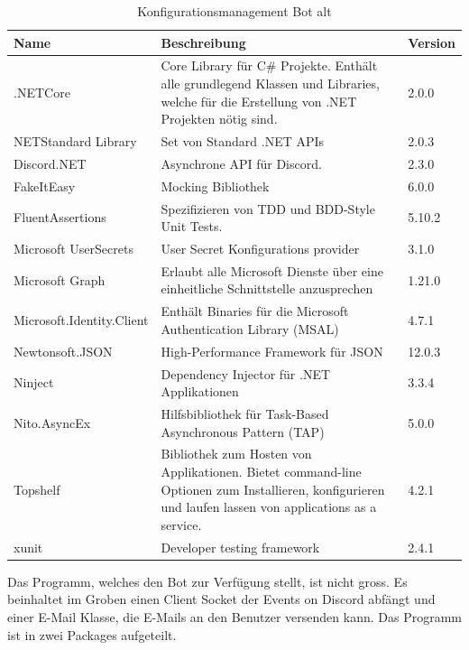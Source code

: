 \documentclass[a4paper, table]{article}
\begin{document}
\begin{table}[h]
    \centering
    \begin{tabular}{|l|p{20em}|l|}
        \hline
        \rowcolor[gray]{.9} Name & Beschreibung & Version \\
        \hline
        .NETCore & Core Library für C\# Projekte.
        Enthält alle grundlegend Klassen und Libraries, welche für die Erstellung von .NET Projekten nötig sind. & 2.0.0 \\
        \hline
        NETStandard Library & Set von Standard .NET \gls{API}s & 2.0.3 \\
        \hline
        Discord.NET & Asynchrone \gls{API} für Discord. & 2.3.0 \\
        \hline
        FakeItEasy & Mocking Bibliothek & 6.0.0 \\
        \hline
        FluentAssertions & Spezifizieren von TDD und BDD-Style Unit Tests. & 5.10.2 \\
        \hline
        Microsoft UserSecrets & User Secret Konfigurations provider & 3.1.0 \\
        \hline
        Microsoft Graph & Erlaubt alle Microsoft Dienste über eine einheitliche Schnittstelle anzusprechen & 1.21.0 \\
        \hline
        Microsoft.Identity.Client & Enthält Binaries für die Microsoft Authentication Library (MSAL) & 4.7.1 \\
        \hline
        Newtonsoft.JSON & High-Performance Framework für \gls{JSON} & 12.0.3 \\
        \hline
        Ninject & Dependency Injector für .NET Applikationen & 3.3.4 \\
        \hline
        Nito.AsyncEx & Hilfsbibliothek für Task-Based Asynchronous Pattern (TAP) & 5.0.0 \\
        \hline
        Topshelf & Bibliothek zum Hosten von Applikationen. 
        Bietet command-line Optionen zum Installieren, konfigurieren und laufen lassen von applications as a service. & 4.2.1 \\
        \hline
        xunit & Developer testing framework & 2.4.1 \\
        \hline
    \end{tabular}
    \caption{Konfigurationsmanagement Bot alt}
    \label{tab: Konfigurationsmanagement-Bot-alt}
\end{table}


Das Programm, welches den Bot zur Verfügung stellt, ist nicht gross. Es beinhaltet im Groben einen Client Socket der
Events on Discord abfängt und einer E-Mail Klasse, die E-Mails an den Benutzer versenden kann.
Das Programm ist in zwei Packages aufgeteilt.
\end{document}

